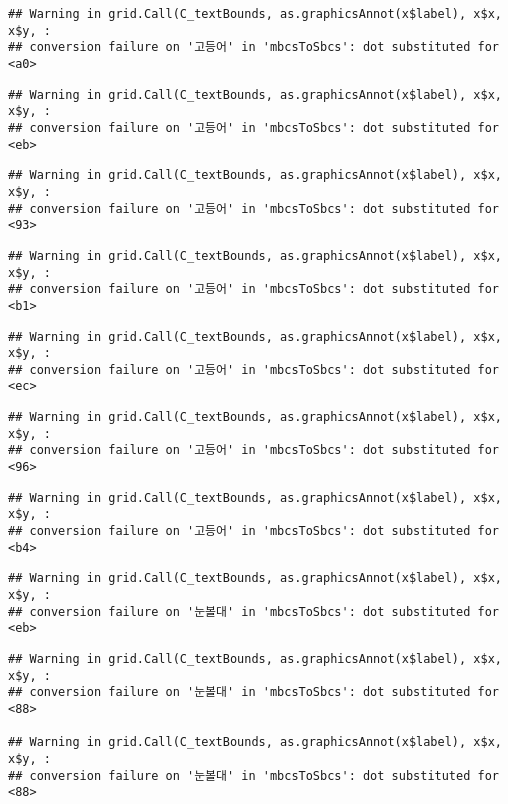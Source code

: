 \documentclass[
]{article}
\begin{document}
\begin{verbatim}
## Warning in grid.Call(C_textBounds, as.graphicsAnnot(x$label), x$x, x$y, :
## conversion failure on '고등어' in 'mbcsToSbcs': dot substituted for <a0>
\end{verbatim}

\begin{verbatim}
## Warning in grid.Call(C_textBounds, as.graphicsAnnot(x$label), x$x, x$y, :
## conversion failure on '고등어' in 'mbcsToSbcs': dot substituted for <eb>
\end{verbatim}

\begin{verbatim}
## Warning in grid.Call(C_textBounds, as.graphicsAnnot(x$label), x$x, x$y, :
## conversion failure on '고등어' in 'mbcsToSbcs': dot substituted for <93>
\end{verbatim}

\begin{verbatim}
## Warning in grid.Call(C_textBounds, as.graphicsAnnot(x$label), x$x, x$y, :
## conversion failure on '고등어' in 'mbcsToSbcs': dot substituted for <b1>
\end{verbatim}

\begin{verbatim}
## Warning in grid.Call(C_textBounds, as.graphicsAnnot(x$label), x$x, x$y, :
## conversion failure on '고등어' in 'mbcsToSbcs': dot substituted for <ec>
\end{verbatim}

\begin{verbatim}
## Warning in grid.Call(C_textBounds, as.graphicsAnnot(x$label), x$x, x$y, :
## conversion failure on '고등어' in 'mbcsToSbcs': dot substituted for <96>
\end{verbatim}

\begin{verbatim}
## Warning in grid.Call(C_textBounds, as.graphicsAnnot(x$label), x$x, x$y, :
## conversion failure on '고등어' in 'mbcsToSbcs': dot substituted for <b4>
\end{verbatim}

\begin{verbatim}
## Warning in grid.Call(C_textBounds, as.graphicsAnnot(x$label), x$x, x$y, :
## conversion failure on '눈볼대' in 'mbcsToSbcs': dot substituted for <eb>
\end{verbatim}

\begin{verbatim}
## Warning in grid.Call(C_textBounds, as.graphicsAnnot(x$label), x$x, x$y, :
## conversion failure on '눈볼대' in 'mbcsToSbcs': dot substituted for <88>

## Warning in grid.Call(C_textBounds, as.graphicsAnnot(x$label), x$x, x$y, :
## conversion failure on '눈볼대' in 'mbcsToSbcs': dot substituted for <88>
\end{verbatim}
\end{document}

